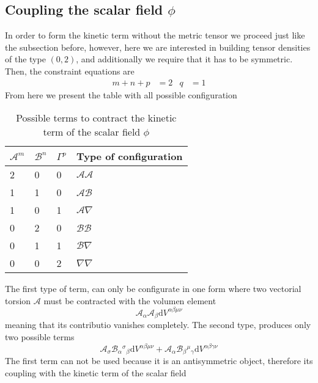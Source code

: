 \documentclass[10pt,a4paper]{article}
\begin{document}
\subsection{Coupling the scalar field $\phi$}

In order to form the kinetic term without the metric tensor we proceed just like the subsection before, however, here we are interested in building
tensor densities of the type $(0,2)$, and additionally we require that it has to be symmetric. Then, the constraint equations are
\begin{align}
  m + n + p & = 2 & q & = 1
\end{align}
From here we present the table with all possible configuration
\begin{table}[h]
  \begin{center}
    \begin{tabular}{ | p{1cm} | p{1cm} | p{1cm} | p{3.5cm} |}
    \hline
    $\mathcal{A}^m$ & $\mathcal{B}^n$ & $\Gamma^p$ & Type of configuration \\ \hline
    2 & 0 & 0 & $\mathcal{A}\mathcal{A}$  \\
    1 & 1 & 0 & $\mathcal{A}\mathcal{B}$  \\
    1 & 0 & 1 & $\mathcal{A}\nabla$    \\
    0 & 2 & 0 & $\mathcal{B}\mathcal{B}$  \\
    0 & 1 & 1 & $\mathcal{B}\nabla$   \\
    0 & 0 & 2 & $\nabla\nabla $     \\ \hline
    \end{tabular}
    \caption{Possible terms to contract the kinetic term of the scalar field $\phi$}
  \end{center}
  \end{table}
The first type of term, can only be configurate in one form where two vectorial torsion $\mathcal{A}$ must be contracted with the volumen element
\begin{equation*}
    \mathcal{A}_\alpha\mathcal{A}_\beta\mathrm{d}V^{\alpha\beta\mu\nu} 
\end{equation*}
meaning that its contributio vanishes completely. The second type, produces only two possible terms
\begin{equation*}
    \mathcal{A}_\sigma\mathcal{B}_{\alpha}{}^{\sigma}{}_{\beta}\mathrm{d}V^{\alpha\beta\mu\nu} + 
    \mathcal{A}_\alpha\mathcal{B}_{\beta}{}^{\mu}{}_{\gamma}\mathrm{d}V^{\alpha\beta\gamma\nu}
\end{equation*} 
The first term can not be used because it is an antisymmetric object, therefore its coupling with the kinetic term of the scalar field
\end{document}
